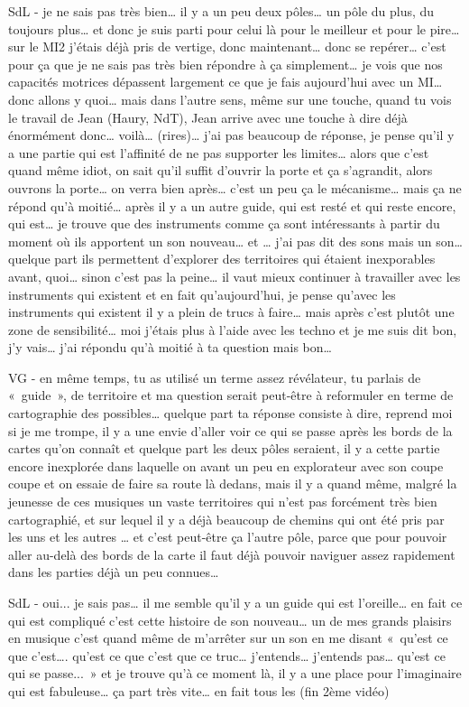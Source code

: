 SdL - je ne sais pas très bien… il y a un peu deux pôles… un pôle du plus, du toujours plus… et donc je suis parti pour celui là pour le meilleur et pour le pire… sur le MI2 j'étais déjà pris de vertige, donc maintenant… donc se repérer…  c'est pour ça que je ne sais pas très bien répondre à ça simplement… je vois que nos capacités motrices dépassent largement ce que je fais aujourd'hui avec un MI… donc allons y quoi… mais dans l'autre sens, même sur une touche, quand tu vois le travail de Jean (Haury, NdT), Jean arrive avec une touche à dire déjà énormément donc… voilà… (rires)… j'ai pas beaucoup de réponse, je pense qu'il y a une partie qui est l'affinité de ne pas supporter les limites… alors que c'est quand même idiot, on sait qu'il suffit d'ouvrir la porte et ça s'agrandit, alors ouvrons la porte… on verra bien après… c'est un peu ça le mécanisme… mais ça ne répond qu'à moitié… après il y a un autre guide, qui est resté et qui reste encore, qui est… je trouve que des instruments comme ça sont intéressants à partir du moment où ils apportent un son nouveau… et … j'ai pas dit des sons mais un son… quelque part ils permettent d'explorer des territoires qui étaient inexporables avant, quoi… sinon c'est pas la peine… il vaut mieux continuer à travailler avec les instruments qui existent et en fait qu'aujourd'hui, je pense qu'avec les instruments qui existent il y a plein de trucs à faire… mais après c'est plutôt une zone de sensibilité… moi j'étais plus à l'aide avec les techno et je me suis dit bon, j'y vais… j'ai répondu qu'à moitié à ta question mais bon… 

VG - en même temps, tu as utilisé un terme assez révélateur, tu parlais de « guide », de territoire et ma question serait peut-être à reformuler en terme de cartographie des possibles… quelque part ta réponse consiste à dire, reprend moi si je me trompe, il y a une envie d'aller voir ce qui se passe après les bords de la cartes qu'on connaît et quelque part les deux pôles seraient, il y a cette partie encore inexplorée dans laquelle on avant un peu en explorateur avec son coupe coupe et on essaie de faire sa route là dedans, mais il y a quand même, malgré la jeunesse de ces musiques un vaste territoires qui n'est pas forcément très bien cartographié, et sur lequel il y a déjà beaucoup de chemins qui ont été pris par les uns et les autres … et c'est peut-être ça l'autre pôle, parce que pour pouvoir aller au-delà des bords de la carte il faut déjà pouvoir naviguer assez rapidement dans les parties déjà un peu connues… 

SdL - oui... je sais pas… il me semble qu'il y a un guide qui est l'oreille… en fait ce qui est compliqué c'est cette histoire de son nouveau… un de mes grands plaisirs en musique c'est quand même de m'arrêter sur un son en me disant « qu'est ce que c'est…. qu'est ce que c'est que ce truc… j'entends… j'entends pas… qu'est ce qui se passe... » et je trouve qu'à ce moment là, il y a une place pour l'imaginaire qui est fabuleuse… ça part très vite… en fait tous les (fin 2ème vidéo) 
